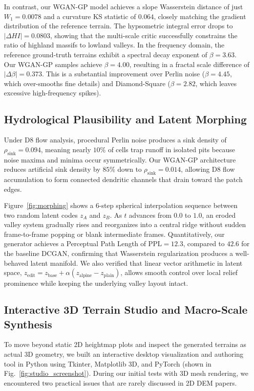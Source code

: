 \documentclass[conference]{IEEEtran}
\begin{document}
In contrast, our WGAN-GP model achieves a slope Wasserstein distance of just $W_1 = 0.0078$ and a curvature KS statistic of $0.064$, closely matching the gradient distribution of the reference terrain. The hypsometric integral error drops to $|\Delta HI| = 0.0803$, showing that the multi-scale critic successfully constrains the ratio of highland massifs to lowland valleys. In the frequency domain, the reference ground-truth terrains exhibit a spectral decay exponent of $\beta = 3.63$. Our WGAN-GP samples achieve $\beta = 4.00$, resulting in a fractal scale difference of $|\Delta \beta| = 0.373$. This is a substantial improvement over Perlin noise ($\beta = 4.45$, which over-smooths fine details) and Diamond-Square ($\beta = 2.82$, which leaves excessive high-frequency spikes).

\subsection{Hydrological Plausibility and Latent Morphing}
Under D8 flow analysis, procedural Perlin noise produces a sink density of $\rho_{\text{sink}} = 0.094$, meaning nearly $10\%$ of cells trap runoff in isolated pits because noise maxima and minima occur symmetrically. Our WGAN-GP architecture reduces artificial sink density by $85\%$ down to $\rho_{\text{sink}} = 0.014$, allowing D8 flow accumulation to form connected dendritic channels that drain toward the patch edges.

Figure~\ref{fig:morphing} shows a 6-step spherical interpolation sequence between two random latent codes $z_A$ and $z_B$. As $t$ advances from $0.0$ to $1.0$, an eroded valley system gradually rises and reorganizes into a central ridge without sudden frame-to-frame popping or blank intermediate frames. Quantitatively, our generator achieves a Perceptual Path Length of $\text{PPL} = 12.3$, compared to $42.6$ for the baseline DCGAN, confirming that Wasserstein regularization produces a well-behaved latent manifold. We also verified that linear vector arithmetic in latent space, $z_{\text{edit}} = z_{\text{base}} + \alpha(z_{\text{alpine}} - z_{\text{plain}})$, allows smooth control over local relief prominence while keeping the underlying valley layout intact.

\subsection{Interactive 3D Terrain Studio and Macro-Scale Synthesis}
To move beyond static 2D heightmap plots and inspect the generated terrains as actual 3D geometry, we built an interactive desktop visualization and authoring tool in Python using Tkinter, Matplotlib 3D, and PyTorch (shown in Fig.~\ref{fig:studio_screenshot}). During our initial tests with 3D mesh rendering, we encountered two practical issues that are rarely discussed in 2D DEM papers.
\end{document}
